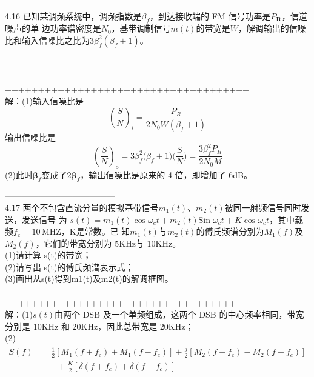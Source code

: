\documentclass[utf8]{article}
\begin{document}
---------------------------------------\\
4.16 已知某调频系统中，调频指数是$\beta_{f}$，到达接收端的 FM 信号功率是$P_{\boldsymbol{R}}$，信道噪声的单
边功率谱密度是$\textstyle{N_{0}}$，基带调制信号$m\left(t\right)$的带宽是$\textstyle W$，解调输出的信噪比和输入信噪比之比为$3\beta_{f}^{2}\left(\beta_{f}+1\right)$。 \\
\indent{}\\
\indent{}\\
\indent{}\\
+++++++++++++++++++++++++++++++++++++\\
解：(1)输入信噪比是
$$\left(\frac{S}{N}\right)_{i}=\frac{P_{\!R}}{2N_{\!0}W\!\left(\beta_{\!f}+1\right)}$$
输出信噪比是
$$\left(\frac{S}{N}\right)_{o}=3\beta_{f}^{2}\big(\beta_{f}+1\bigg)\bigg(\frac{S}{N}\bigg)=\frac{3\beta_{f}^{2}P_{R}}{2N_{0}M}$$
(2)此时${\boldsymbol{\beta}}_{f}$变成了${\mathcal{2}}{\boldsymbol{\beta}}_{f}$，输出信噪比是原来的 4 倍，即增加了 6dB。



---------------------------------------\\
4.17 两个不包含直流分量的模拟基带信号$m_{1}(t)$、$m_{2}(t)$被同一射频信号同时发送，发送信号
为 $s\left(t\right)=m_{1}\left(t\right)\cos\omega_{c}t+m_{2}\left(t\right)\mathrm{Sin}\;\omega_{c}t+K\cos\omega_{c}t$，其中载频$f_{c}{\mathrm{=}}10\,\mathrm{MHZ}$，K是常数。已
知$m_{1}(t)$与$m_{2}(t)$的傅氏频谱分别为$M_{1}(f)$及$M_{2}(f)$，它们的带宽分别为 5KHz与
10KHz。 \\
(1)请计算 s(t)的带宽；\\
(2)请写出 s(t)的傅氏频谱表示式； \\
(3)画出从s(t)得到m1(t)及m2(t)的解调框图。\\
\\
+++++++++++++++++++++++++++++++++++++\\
解：(1)${s}(t)$由两个 DSB 及一个单频组成，这两个 DSB 的中心频率相同，带宽分别是 10KHz
和 20KHz，因此总带宽是 20KHz；\\
(2) 
\begin{align*}
S(f) &=\frac{1}{2}\left[M_1(f+f_c)+M_1(f-f_c)\right] + \frac{j}{2}\left[M_2(f+f_c)-M_2(f-f_c)\right] \\
&\qquad + \frac{K}{2}\left[\delta(f+f_c)+\delta(f-f_c)\right]
\end{align*}
\end{document}

